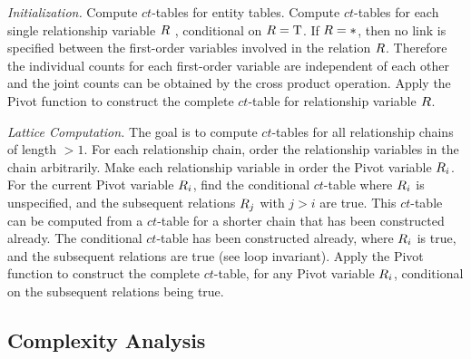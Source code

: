\documentclass{acm_proc_article-sp}
\newcommand{\ct}{\mathit{ct}}
\begin{document}
{\em Initialization.} Compute $\ct$-tables for entity tables.
Compute $\ct$-tables for each single relationship variable $R$ , conditional on $R = \mathrm{T}$. %
If $R = \ast$, then no link is specified between the first-order variables involved in the relation $R$. Therefore the individual counts for each first-order variable are independent of each other and the joint counts can be obtained by the cross product operation. %
Apply the Pivot function to construct the  complete $\ct$-table for relationship variable $R$. %

{\em Lattice Computation.} The goal is to compute $\ct$-tables for all relationship chains of length $>1$. For each relationship chain, order the relationship variables in the chain arbitrarily. Make each relationship variable in order the Pivot variable $R_{i}$. For the current Pivot variable $R_{i}$, find the conditional $\ct$-table where $R_{i}$ is unspecified, and the subsequent relations $R_{j}$ with $j>i$ are true. This $\ct$-table can be computed from a $ct$-table for a shorter chain that has been constructed already. The conditional $ct$-table   has been constructed already, where $R_{i}$ is true, and the subsequent relations are true (see loop invariant). Apply the Pivot function to construct the  complete $\ct$-table, for any Pivot variable $R_{i}$,  conditional on the subsequent relations being true.

\subsection{Complexity Analysis} 
\label{sec:complexity} 
\end{document}
